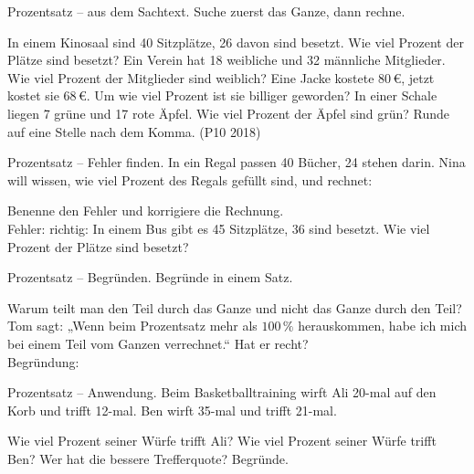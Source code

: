 \begin{aufgabe}{Prozentsatz – aus dem Sachtext. Suche zuerst das Ganze, dann rechne.}
\begin{teile}
\teil In einem Kinosaal sind 40 Sitzplätze, 26 davon sind besetzt. Wie viel Prozent der Plätze sind besetzt? \leerfeld[\%]
\teil Ein Verein hat 18 weibliche und 32 männliche Mitglieder. Wie viel Prozent der Mitglieder sind weiblich? \leerfeld[\%]
\teil Eine Jacke kostete $80\,€$, jetzt kostet sie $68\,€$. Um wie viel Prozent ist sie billiger geworden? \leerfeld[\%]
\teil In einer Schale liegen 7 grüne und 17 rote Äpfel. Wie viel Prozent der Äpfel sind grün? Runde auf eine Stelle nach dem Komma. \hfill (P10 2018) \\ \leerfeld[\%]
\end{teile}
\end{aufgabe}

\begin{aufgabe}{Prozentsatz – Fehler finden. In ein Regal passen 40 Bücher, 24 stehen darin. Nina will wissen, wie viel Prozent des Regals gefüllt sind, und rechnet:}
\begin{teile}
\teil Benenne den Fehler und korrigiere die Rechnung. \\ Fehler: \dsleer\dsleer\dsleer \quad richtig: \leerfeld[\%]
\teil In einem Bus gibt es 45 Sitzplätze, 36 sind besetzt. Wie viel Prozent der Plätze sind besetzt? \leerfeld[\%]
\end{teile}
\end{aufgabe}

\begin{aufgabe}{Prozentsatz – Begründen. Begründe in einem Satz.}
\begin{teile}
\teil Warum teilt man den Teil durch das Ganze und nicht das Ganze durch den Teil? \\ \dsleer\dsleer\dsleer\dsleer
\teil Tom sagt: „Wenn beim Prozentsatz mehr als $100\,\%$ herauskommen, habe ich mich bei einem Teil vom Ganzen verrechnet.“ Hat er recht? \janein \\ Begründung: \dsleer\dsleer\dsleer\dsleer
\end{teile}
\end{aufgabe}

\begin{aufgabe}{Prozentsatz – Anwendung. Beim Basketballtraining wirft Ali 20-mal auf den Korb und trifft 12-mal. Ben wirft 35-mal und trifft 21-mal.}
\begin{teile}
\teil Wie viel Prozent seiner Würfe trifft Ali? \leerfeld[\%]
\teil Wie viel Prozent seiner Würfe trifft Ben? \leerfeld[\%]
\teil Wer hat die bessere Trefferquote? Begründe. \\ \dsleer\dsleer\dsleer\dsleer
\end{teile}
\end{aufgabe}
